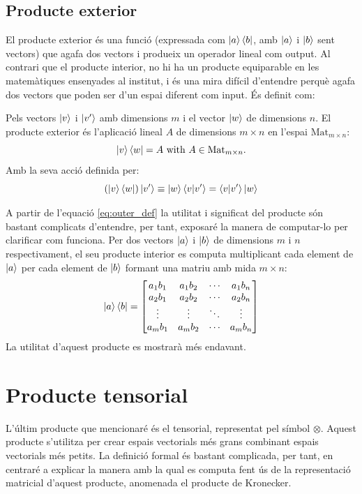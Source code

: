 \subsection{Producte exterior}
El producte exterior és una funció (expressada com $\ket{a}\bra{b}$, amb $\ket{a}$ i $\ket{b}$ sent vectors) que agafa dos vectors i produeix un operador lineal com output. Al contrari que el producte interior, no hi ha un producte equiparable en les matemàtiques ensenyades al institut, i és una mira difícil d'entendre perquè agafa dos vectors que poden ser d'un espai diferent com input. És definit com:

Pels vectors $\ket{v}$ i $\ket{v'}$ amb dimensions $m$ i el vector $\ket{w}$ de dimensions $n$. El producte exterior és l'aplicació lineal $A$ de dimensions $m \times n$ en l'espai $\mathrm{Mat}_{m\times n}$:
$$
\ket{v}\bra{w} = A \text{ with } A\in \mathrm{Mat}_{m\times n} .
$$ 
Amb la seva acció definida per: 
\begin{equation}
	(\ket{v}\bra{w})\ket{v'} \equiv \ket{w}\bra{v}\ket{v'} = \bra{v}\ket{v'}\ket{w}
	\label{eq:outer_def}
\end{equation}

A partir de l'equació \eqref{eq:outer_def} la utilitat i significat del producte són bastant complicats d'entendre, per tant, exposaré la manera de computar-lo per clarificar com funciona. Per dos vectors $\ket{a}$ i $\ket{b}$ de dimensions $m$ i $n$ respectivament, el seu producte interior es computa multiplicant cada element de $\ket{a}$ per cada element de $\ket{b}$ formant una matriu amb mida $m\times n$:
$$
\ket{a}\bra{b} = \begin{bmatrix}
	a_1 b_1 & a_1 b_2 & \cdots & a_1 b_n \\
	a_2 b_1 & a_2 b_2 & \cdots & a_2 b_n \\
	\vdots  & \vdots  & \ddots& \vdots  \\
	a_m b_1 & a_m b_2 & \cdots & a_m b_n \\
\end{bmatrix}
$$
La utilitat d'aquest producte es mostrarà més endavant.

\section{Producte tensorial}
L'últim producte que mencionaré és el tensorial, representat pel símbol $\otimes$. Aquest producte s'utilitza per crear espais vectorials més grans combinant espais vectorials més petits. La definició formal és bastant complicada, per tant, en centraré a explicar la manera amb la qual es computa fent ús de la representació matricial d'aquest producte, anomenada el producte de Kronecker.


